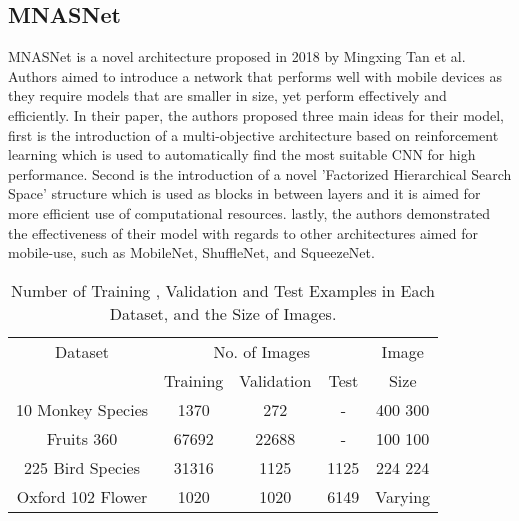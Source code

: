 \documentclass[conference]{IEEEtran}
\begin{document}
\subsection{MNASNet}
MNASNet is a novel architecture proposed in 2018 by Mingxing Tan et al. Authors aimed to introduce a network that performs well with mobile devices as they require models that are smaller in size, yet perform effectively and efficiently. In their paper, the authors proposed three main ideas for their model, first is the introduction of a multi-objective architecture based on reinforcement learning which is used to automatically find the most suitable CNN for high performance. Second is the introduction of a novel 'Factorized Hierarchical Search Space' structure which is used as blocks in between layers and it is aimed for more efficient use of computational resources. lastly, the authors demonstrated the effectiveness of their model with regards to other architectures aimed for mobile-use, such as MobileNet, ShuffleNet, and SqueezeNet.


\begin{table}
		\caption{Number of Training , Validation and Test Examples in Each Dataset, and the Size of Images.}
		\label{Data} \centering
\begin{tabular}{|c|c|c|c|c|}	\hline
    Dataset& \multicolumn{3}{|c|}{No. of Images} & Image\\ \cline{2-4}
	 & Training  & Validation    &Test 	&  Size \\ \hline
	   
	10 Monkey Species & 1370	&	272   & -   & 400  300    \\ \hline
	
	Fruits 360 & 67692	&	22688   & -   & 100  100    \\ \hline
	225 Bird Species & 31316 & 1125 & 1125 & 224  224    \\ \hline
	Oxford 102 Flower & 1020 & 1020 & 6149 & Varying    \\ \hline
\end{tabular} 
\end{table}	
\end{document}
